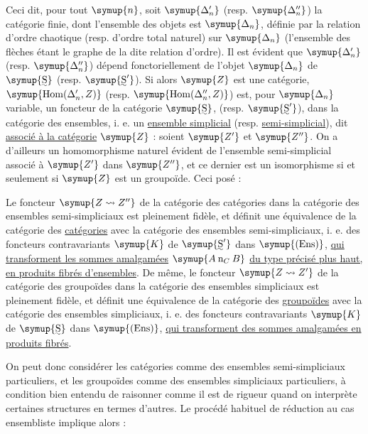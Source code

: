 Ceci dit, pour tout $\symup{n}$, soit $\symup{\Delta'_n}$ (resp. $\symup{\Delta''_n}$) la catégorie
finie, dont l'ensemble des objets est $\symup{\Delta_n}$, définie par la relation
d'ordre chaotique (resp. d'ordre total naturel) sur $\symup{\Delta_n}$ (l'ensemble
des flèches étant le graphe de la dite relation d'ordre). Il est évident que
$\symup{\Delta'_n}$ (resp. $\symup{\Delta''_n}$) dépend fonctoriellement de l'objet $\symup{\Delta_n}$
de $\symup{\text{\uwave{S}}}$ (resp. $\symup{\text{\uwave{S}}'}$). Si alors $\symup{Z}$ est une catégorie,
$\symup{\operatorname{Hom}(\Delta'_n,Z)}$ (resp.
$\symup{\operatorname{Hom}(\Delta''_n,Z)}$) est, pour $\symup{\Delta_n}$ variable, un foncteur
de la catégorie $\symup{\text{\uwave{S}}}$, (resp. $\symup{\text{\uwave{S}}'}$), dans la catégorie des
ensembles, i. e. un \uline{ensemble simplicial} (resp. \uline{semi-simplicial}), dit
\uline{associé à la catégorie} $\symup{Z}$ : soient $\symup{Z'}$ et $\symup{Z''}$. On a d'ailleurs un
homomorphisme naturel évident de l'ensemble semi-simplicial associé à $\symup{Z'}$
dans $\symup{Z''}$, et ce dernier est un isomorphisme si et seulement si $\symup{Z}$ est un
groupoïde. Ceci posé :

 Le foncteur $\symup{Z\rightsquigarrow Z''}$ de la catégorie des
catégories dans la catégorie des ensembles semi-simpliciaux est pleinement
fidèle, et définit une équivalence de la catégorie des \uline{catégories} avec
la catégorie des ensembles semi-simpliciaux, i. e. des foncteurs contravariants
$\symup{K}$ de $\symup{\text{\uwave{S}}'}$ dans $\symup{(\mathrm{Ens})}$, \uline{qui transforment les sommes amalgamées} $\symup{A\mathbin{\mathrm{n}}_C B}$ \uline{du type précisé plus haut, en produits fibrés d'ensembles}. De même, le foncteur $\symup{Z\rightsquigarrow Z'}$ de la catégorie des
groupoïdes dans la catégorie des ensembles simpliciaux est pleinement fidèle,
et définit une équivalence de la catégorie des \uline{groupoïdes} avec la
catégorie des
ensembles simpliciaux, i. e. des foncteurs contravariants $\symup{K}$ de $\symup{\text{\uwave{S}}}$
dans $\symup{(\mathrm{Ens})}$, \uline{qui transforment des sommes amalgamées en produits fibrés}.

On peut donc considérer les catégories comme des ensembles semi-simpliciaux
particuliers, et les groupoïdes comme des ensembles simpliciaux particuliers,
à condition bien entendu de raisonner  comme il est
de rigueur quand on interprète certaines structures en termes d'autres. Le
procédé habituel de réduction au cas ensembliste implique alors :

